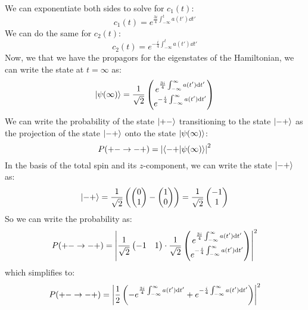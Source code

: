 \documentclass[12pt]{article}
\begin{document}
We can exponentiate both sides to solve for $c_1(t)$:
\begin{equation}
  c_1(t) = e^{\frac{3i}{4}\int_{-\infty}^{t} a(t')\dd{t'}}
\end{equation}
We can do the same for $c_2(t)$:
\begin{equation}
  c_2(t) = e^{-\frac{i}{4}\int_{-\infty}^{t} a(t')\dd{t'}}
\end{equation}
Now, we that we have the propagors for the eigenstates of the Hamiltonian, we can write the state at $t=\infty$ as:
\begin{equation}
  \ket{\psi (\infty)} = \frac{1}{\sqrt{2}}\begin{pmatrix} e^{\frac{3i}{4}\int_{-\infty}^{\infty} a(t')\dd{t'}} \\ e^{-\frac{i}{4}\int_{-\infty}^{\infty} a(t')\dd{t'}} \end{pmatrix}
\end{equation}
We can write the probability of the state $\ket{+-}$ transitioning to the state $\ket{-+}$ as the projection of the state $\ket{-+}$ onto the state $\ket{\psi (\infty)}$:
\begin{equation}
  P(+-\rightarrow-+) = \abs{\braket{-+}{\psi (\infty)}}^2
\end{equation}
In the basis of the total spin and its $z$-component, we can write the state $\ket{-+}$ as:
\begin{equation}
  \ket{-+} = \frac{1}{\sqrt{2}}\left( 
  \begin{pmatrix} 0 \\ 1 \end{pmatrix} - \begin{pmatrix} 1 \\ 0 \end{pmatrix}
  \right) = \frac{1}{\sqrt{2}}\begin{pmatrix} -1 \\ 1 \end{pmatrix}
\end{equation}
So we can write the probability as:
\begin{equation}
  P(+-\rightarrow-+) = \abs{\frac{1}{\sqrt{2}}\begin{pmatrix} -1 & 1 \end{pmatrix}\cdot \frac{1}{\sqrt{2}}\begin{pmatrix} e^{\frac{3i}{4}\int_{-\infty}^{\infty} a(t')\dd{t'}} \\ e^{-\frac{i}{4}\int_{-\infty}^{\infty} a(t')\dd{t'}} \end{pmatrix}}^2
\end{equation}
which simplifies to:
\begin{equation}
  P(+-\rightarrow-+) = \abs{\frac{1}{2}\left(-e^{\frac{3i}{4}\int_{-\infty}^{\infty} a(t')\dd{t'}} + e^{-\frac{i}{4}\int_{-\infty}^{\infty} a(t')\dd{t'}}\right)}^2
\end{equation}
\end{document}

